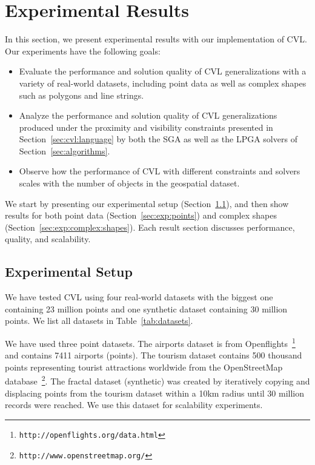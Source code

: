 \section{Experimental Results}
\label{sec:experimental}


In this section, we present experimental results with our implementation of CVL. Our experiments have the following goals:

\begin{itemize}

\item Evaluate the performance and solution quality of CVL generalizations with a variety of real-world datasets, including point data as well as complex shapes such as polygons and line strings. 

\item Analyze the performance and solution quality of CVL generalizations produced under the proximity and visibility constraints presented in Section~\ref{sec:cvl:language} by both the SGA as well as the LPGA solvers of Section~\ref{sec:algorithms}.

\item Observe how the performance of CVL with different constraints and solvers scales with the number of objects in the geospatial dataset.

\end{itemize}

We start by presenting our experimental setup (Section~\ref{sec:exp:setup}), and then show results for both point data (Section~\ref{sec:exp:points}) and complex shapes (Section~\ref{sec:exp:complex:shapes}). Each result section discusses performance, quality, and scalability. 


\subsection{Experimental Setup}
\label{sec:exp:setup}

We have tested CVL using four real-world datasets with the biggest one containing 23 million points and one synthetic dataset containing 30 million points. We list all datasets in Table~\ref{tab:datasets}. 

We have used three point datasets. The airports dataset is from Openflights~\footnote{\texttt{http://openflights.org/data.html}} and contains 7411 airports (points). The tourism dataset contains 500 thousand points representing tourist attractions worldwide from the OpenStreetMap database~\footnote{\texttt{http://www.openstreetmap.org/}}. The fractal dataset (synthetic) was created by iteratively copying and displacing points from the tourism dataset within a 10km radius until 30 million records were reached. We use this dataset for scalability experiments.

